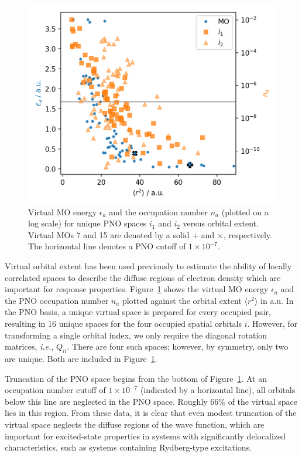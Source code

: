 \begin{figure}
    \centering
    \includegraphics[scale=0.75]{p3/figures/extent.png}
    \caption{Virtual MO energy $\epsilon_a$ and the
    occupation number $n_a$ (plotted on a log scale)
    for unique PNO spaces $i_1$ and $i_2$ 
    versus orbital extent.
    Virtual MOs 7 and 15 are denoted by a solid $\boldsymbol{+}$ 
    and $\boldsymbol{\times}$, respectively.
    The horizontal line denotes a PNO cutoff 
    of $1\times 10^{-7}$.}
    \label{fig:extent}
\end{figure}
Virtual orbital extent has been used previously\cite{Kumar2017,DCunha2021} 
to estimate the ability of locally correlated spaces to describe the 
diffuse regions of electron density which are important for response
properties. 
Figure~\ref{fig:extent} shows the virtual MO energy $\epsilon_a$ and the 
PNO occupation number $n_a$ plotted against the orbital extent
$\langle r^2 \rangle$ in a.u. 
In the PNO basis, a unique virtual space is prepared
for every occupied pair, resulting in 16 unique spaces for the four occupied
spatial orbitals $i$. However, for transforming
a single orbital index, we only require the diagonal rotation matrices,
\textit{i.e.}, $Q_{ii}$. There are four such spaces; however, by symmetry,
only two are unique. Both are included in Figure~\ref{fig:extent}. 

Truncation of the PNO space begins from the bottom of Figure~\ref{fig:extent}. 
At an occupation number cutoff of $1\times 10^{-7}$ (indicated by a horizontal
line), all orbitals below this line are neglected in the PNO space. Roughly
66\% of the virtual space lies in this region. From these data, it is clear
that even modest truncation of the virtual space neglects the diffuse 
regions of the wave function, which are important for excited-state
properties in systems with significantly delocalized characteristics,
such as systems containing Rydberg-type excitations.

